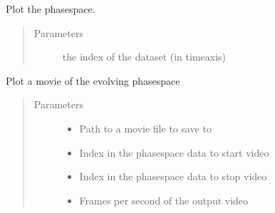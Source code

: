\documentclass[letterpaper,10pt,openany,oneside,english]{sphinxmanual}
\begin{document}
\begin{fulllineitems}
\begin{fulllineitems}
\label{\detokenize{plots:plots.PhaseSpace.plot_ps}}
Plot the phasespace.
\begin{quote}\begin{description}
\item[{Parameters}] \leavevmode
{} \textendash{} the index of the dataset (in timeaxis)

\end{description}\end{quote}

\end{fulllineitems}


\begin{fulllineitems}
\label{\detokenize{plots:plots.PhaseSpace.center_of_mass}}
\end{fulllineitems}


\begin{fulllineitems}
\label{\detokenize{plots:plots.PhaseSpace.phase_space_movie}}
Plot a movie of the evolving phasespace
\begin{quote}\begin{description}
\item[{Parameters}] \leavevmode\begin{itemize}
\item {} 
 \textendash{} Path to a movie file to save to

\item {} 
 \textendash{} Index in the phasespace data to start video

\item {} 
 \textendash{} Index in the phasespace data to stop video

\item {} 
 \textendash{} Frames per second of the output video


\end{itemize}
\end{description}
\end{quote}
\end{fulllineitems}
\end{fulllineitems}
\end{document}

